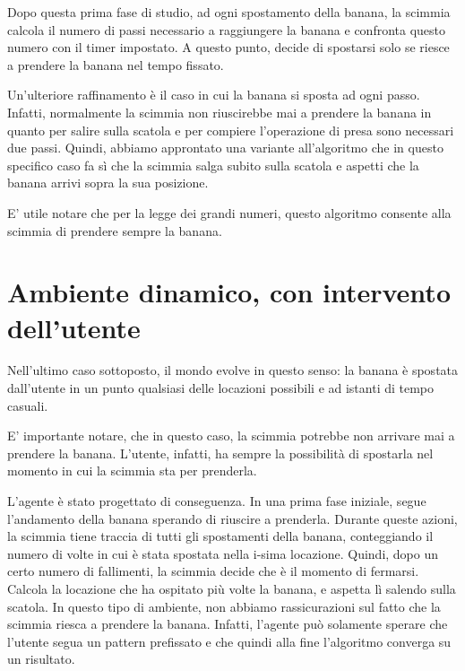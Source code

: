 \documentclass[a4paper,10pt]{article}
\begin{document}
	Dopo questa prima fase di studio, ad ogni spostamento della banana, la scimmia calcola il numero di passi necessario a raggiungere la banana
        e confronta questo numero con il timer impostato. A questo punto, decide di spostarsi solo se riesce a prendere la banana nel tempo fissato.
        
	Un'ulteriore raffinamento è il caso in cui la banana si sposta ad ogni passo. Infatti, normalmente la scimmia non riuscirebbe mai a prendere 
	la banana in quanto per salire sulla scatola e per compiere l'operazione di presa sono necessari due passi. Quindi, abbiamo approntato una
	variante all'algoritmo che in questo specifico caso fa sì che la scimmia salga subito sulla scatola e aspetti che la banana arrivi sopra la sua posizione. 

	E' utile notare che per la legge dei grandi numeri, questo algoritmo consente alla scimmia di prendere sempre la banana.

    \section{Ambiente dinamico, con intervento dell'utente}
        Nell'ultimo caso sottoposto, il mondo evolve in questo senso: la banana è spostata dall'utente in un punto qualsiasi delle locazioni possibili e ad
	istanti di tempo casuali.

	E' importante notare, che in questo caso, la scimmia potrebbe non arrivare mai a prendere la banana. L'utente, infatti, ha sempre la possibilità di
	spostarla nel momento in cui la scimmia sta per prenderla.

	L'agente è stato progettato di conseguenza. In una prima fase iniziale, segue l'andamento della banana sperando di
	riuscire a prenderla. Durante queste azioni, la scimmia tiene traccia di tutti gli spostamenti della banana, conteggiando il numero di volte in cui è stata
	spostata nella i-sima locazione.
	Quindi, dopo un certo numero di fallimenti, la scimmia decide che è il momento di fermarsi. Calcola la locazione che ha ospitato più volte la
	banana, e aspetta lì salendo sulla scatola. In questo tipo di ambiente,	non abbiamo rassicurazioni sul fatto che la scimmia riesca a prendere la
	banana. Infatti, l'agente può solamente sperare che l'utente segua un pattern prefissato e che quindi alla fine l'algoritmo converga su un
	risultato.
\end{document}
